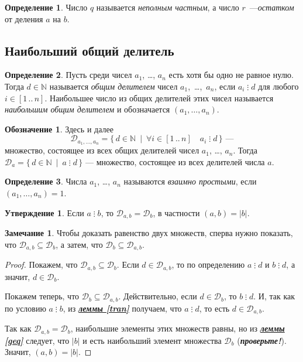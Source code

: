 \documentclass[14pt, a4paper]{extarticle}
\theoremstyle{definition}
\newtheorem*{definition}{Определение}
\newtheorem*{remark}{Замечание}
\newtheorem*{desig}{Обозначение}
\newtheorem{statement}{Утверждение}
\newcommand{\divisible}{\mathop{\vdots}}
\begin{document}
	\begin{definition}
		Число $q$ называется \emph{неполным частным}, а число $r$~---\emph{остатком} от деления $a$ на $b$.
	\end{definition}

\subsection{Наибольший общий делитель}
\label{nod}

	\begin{definition}
		Пусть среди чисел $a_1$, \dots, $a_n$ есть хотя бы одно не равное нулю. Тогда $d\in\mathbb{N}$ называется \emph{общим делителем} чисел \mbox{$a_1$, \dots, $a_n$}, если $a_i\divisible d$ для любого $i\in[1\,..\,n]$. Наибольшее число из общих делителей этих чисел называется \emph{наибольшим общим делителем} и обозначается $(a_1,\dots,a_n)$.
	\end{definition}

	\begin{desig}
		Здесь и далее $$\mathcal{D}_{a_1,\dots,a_n}=\{\,d\in\mathbb{N}\:\mid\:\forall i\in[1\,..\,n]\quad a_i\divisible d\,\}\text{ ---}$$ множество, состоящее из всех общих делителей чисел $a_1$, \dots, $a_n$. Тогда $\mathcal{D}_a=\{\,d\in\mathbb{N}\:\mid\:a\divisible d\,\}$ --- множество, состоящее из всех делителей числа $a$.
	\end{desig}

	\begin{definition}
		Числа $a_1$, \dots, $a_n$ называются \emph{взаимно простыми}, если $(a_1,\dots,a_n)=1$.
	\end{definition}

	\begin{statement}
	\label{nodab}
		Если $a\divisible b$, то $\mathcal{D}_{a,b}=\mathcal{D}_b$, в частности $(a,b)=|b|$.
	\end{statement}
	\begin{remark}
		Чтобы доказать равенство двух множеств, сперва нужно показать, что $\mathcal{D}_{a,b}\subseteq\mathcal{D}_b$, а затем, что $\mathcal{D}_b\subseteq\mathcal{D}_{a,b}$.
	\end{remark}
	\begin{proof}
		Покажем, что $\mathcal{D}_{a,b}\subseteq\mathcal{D}_b$. Если $d\in\mathcal{D}_{a,b}$, то по определению $a\divisible d$ и $b\divisible d$, а значит, $d\in\mathcal{D}_b$.
		
		Покажем теперь, что $\mathcal{D}_b\subseteq\mathcal{D}_{a,b}$. Действительно, если $d\in\mathcal{D}_b$, то $b\divisible d$. И, так как по условию $a\divisible b$, из \hyperref[tran]{\textbf{\textit{леммы \ref*{tran}}}} получаем, что $a\divisible d$, то есть $d\in\mathcal{D}_{a,b}$.
		
		Так как $\mathcal{D}_{a,b}=\mathcal{D}_b$, наибольшие элементы этих множеств равны, но из \hyperref[geq]{\textbf{\textit{леммы \ref*{geq}}}} следует, что $|b|$ и есть наибольший элемент множества $\mathcal{D}_b$ (\textbf{\textit{проверьте!}}). Значит, $(a,b)=|b|$.
	\end{proof}
\end{document}
